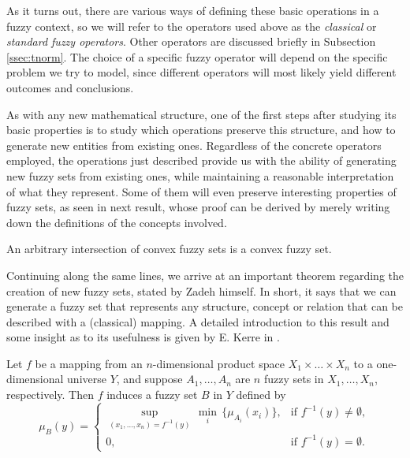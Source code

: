 As it turns out, there are various ways of defining these basic operations in a fuzzy context, so we will refer to the operators used above as the \textit{classical} or \textit{standard fuzzy operators}. Other operators are discussed briefly in Subsection \ref{ssec:tnorm}. The choice of a specific fuzzy operator will depend on the specific problem we try to model, since different operators will most likely yield different outcomes and conclusions.

As with any new mathematical structure, one of the first steps after studying its basic properties is to study which operations preserve this structure, and how to generate new entities from existing ones. Regardless of the concrete operators employed, the operations just described provide us with the ability of generating new fuzzy sets from existing ones, while maintaining a reasonable interpretation of what they represent. Some of them will even preserve interesting properties of fuzzy sets, as seen in next result, whose proof can be derived by merely writing down the definitions of the concepts involved.

\begin{prop} An arbitrary intersection of convex fuzzy sets is a convex fuzzy set.
\end{prop}

Continuing along the same lines, we arrive at an important theorem regarding the creation of new fuzzy sets, stated by Zadeh himself. In short, it says that we can generate a fuzzy set that represents any structure, concept or relation that can be described with a (classical) mapping. A detailed introduction to this result and some insight as to its usefulness is given by E. Kerre in \cite{kerre2011tribute}.

\begin{theorem} Let $f$ be a mapping from an $n$-dimensional product space $X_1 \times \dots \times X_n$ to a one-dimensional universe $Y$, and suppose $A_1, \dots, A_n$ are $n$ fuzzy sets in $X_1, \dots, X_n$, respectively. Then $f$ induces a fuzzy set $B$ in $Y$ defined by
\[
\mu_B(y) = \left\{ \begin{array}{cc}
	\sup\limits_{(x_1, \dots, x_n) = f^{-1}(y)} \, \min\limits_i \, \{ \mu_{A_i}(x_i) \}, & \text{if } f^{-1}(y) \ne \emptyset, \\
	0, & \text{if } f^{-1}(y) = \emptyset.
\end{array}\right.
\]

\end{theorem}

